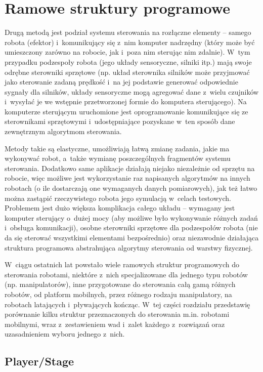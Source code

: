 \section{Ramowe struktury programowe}

Drugą metodą jest podział systemu sterowania na rozłączne elementy -- samego
robota (efektor) i~komunikujący się z~nim komputer nadrzędny (który może być umieszczony
zarówno na robocie, jak i~poza nim sterując nim zdalnie). W~tym przypadku podzespoły
robota (jego układy sensoryczne, silniki itp.) mają swoje odrębne sterowniki sprzętowe
(np. układ sterownika silników może przyjmować jako sterowanie zadaną prędkość
i~na jej podstawie generować odpowiednie sygnały dla silników, układy sensoryczne
mogą agregować dane z~wielu czujników i~wysyłać je we wstępnie przetworzonej formie
do komputera sterującego). Na komputerze sterującym uruchomione jest oprogramowanie
komunikujące się ze sterownikami sprzętowymi i~udostępniające pozyskane w~ten sposób
dane zewnętrznym algorytmom sterowania.

Metody takie są elastyczne, umożliwiają łatwą zmianę zadania, jakie ma wykonywać robot,
a~także wymianę poszczególnych fragmentów systemu sterowania. Dodatkowo same aplikacje
działają niejako niezależnie od sprzętu na robocie, więc możliwe jest wykorzystanie
raz napisanych algorytmów na innych robotach (o ile dostarczają one wymaganych danych
pomiarowych), jak też łatwo można zastąpić rzeczywistego robota jego symulacją w~celach
testowych. Problemem jest dużo większa komplikacja całego układu -- wymagany jest
komputer sterujący o~dużej mocy (aby możliwe było wykonywanie różnych zadań i~obsługa
komunikacji), osobne sterowniki sprzętowe dla podzespołów robota (nie da się sterować
wszystkimi elementami bezpośrednio) oraz niezawodnie działająca struktura programowa
abstrahująca algorytmy sterowania od warstwy fizycznej.

W~ciągu ostatnich lat powstało wiele ramowych struktur programowych do sterowania
robotami, niektóre z~nich specjalizowane dla jednego typu robotów (np. manipulatorów),
inne przygotowane do sterowania całą gamą różnych robotów, od platform mobilnych,
przez różnego rodzaju manipulatory, na robotach latających i~pływających kończąc.
W~tej części rozdziału przedstawię porównanie kilku struktur przeznaczonych do
sterowania m.in. robotami mobilnymi, wraz z~zestawieniem wad i~zalet każdego z~rozwiązań
oraz uzasadnieniem wyboru jednego z~nich.


\subsection{Player/Stage}

